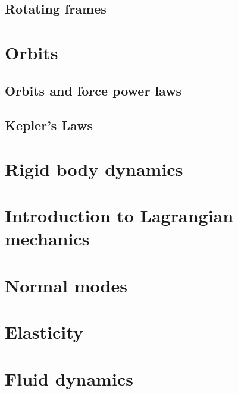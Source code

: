 \documentclass[a4paper]{article}
\begin{document}
\subsection{Rotating frames}



\section{Orbits}\label{sec:orbits}
\subsection{Orbits and force power laws}
\subsection{Kepler's Laws}
\section{Rigid body dynamics}\label{sec:rigid-body-dynamics}
\section{Introduction to Lagrangian mechanics}\label{sec:introduction-to-lagrangian-mechanics}
\section{Normal modes}\label{sec:normal-modes}
\section{Elasticity}\label{sec:elasticity}
\section{Fluid dynamics}\label{sec:fluid-dynamics}
\end{document}
